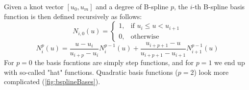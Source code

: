 Given a knot vector $[u_{0}, u_{m}]$ and a degree of B-spline $p$, the $i$-th B-spline basis function is then defined recursively as follows:
\begin{equation}
N_{i,0}(u) =  \begin{cases} 1, & \mbox{if } u_{i} \leq u < u_{i+1} \\ 0, & \mbox{otherwise } \end{cases}
\end{equation} 
\begin{equation}
N_{i}^p(u) = \frac{u - u_{i}}{u_{i+p} - u_{i}}N_{i}^{p-1}(u)  + \frac{u_{i+p+1}-u}{u_{i+p+1} - u_{i+1}}N_{i+1}^{p-1}(u)
\end{equation}
For $p=0$ the basis fucntions are simply step functions, and for $p=1$ we end up with so-called "hat" functions. Quadratic basis functions ($p=2$) look more complicated (\autoref{fig:bsplineBases}).
